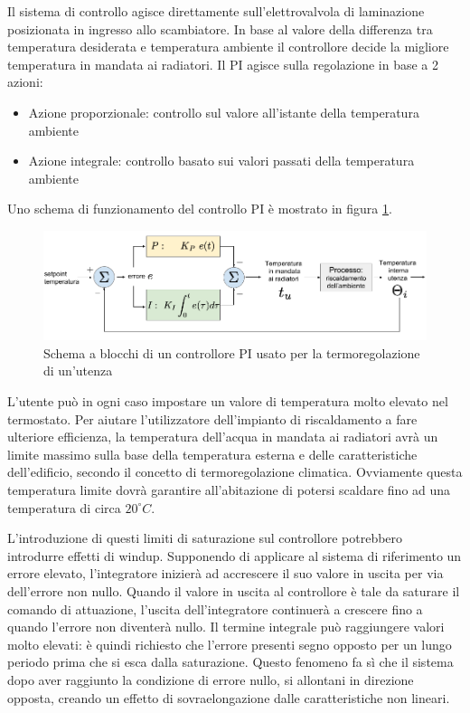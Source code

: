\documentclass[laurea,oneside,11pt]{USiena_tesiLM}
\begin{document}
Il sistema di controllo agisce direttamente sull'elettrovalvola di laminazione posizionata in ingresso allo scambiatore. In base al valore della differenza tra temperatura desiderata e temperatura ambiente il controllore decide la migliore temperatura in mandata ai radiatori. Il PI agisce sulla regolazione in base a 2 azioni:
\begin{itemize}
\item Azione proporzionale: controllo sul valore all'istante della temperatura ambiente
\item  Azione integrale: controllo basato sui valori passati della temperatura ambiente
\end{itemize}
Uno schema di funzionamento del controllo PI è mostrato in figura \ref{fig:PI}.

\begin{figure}[!ht]
\centering
\includegraphics[width=1.05\textwidth]{figure/PI} 
\caption{Schema a blocchi di un controllore PI usato per la termoregolazione di un'utenza}
\label{fig:PI}
\end{figure}
   
L'utente può in ogni caso impostare un valore di temperatura molto elevato nel termostato. Per aiutare l'utilizzatore dell'impianto di riscaldamento a fare ulteriore efficienza, la temperatura dell'acqua in mandata ai radiatori avrà un limite massimo sulla base della temperatura esterna e delle caratteristiche dell'edificio, secondo il concetto di termoregolazione climatica. 
Ovviamente questa temperatura limite dovrà garantire all'abitazione di potersi scaldare fino ad una temperatura di circa $20 ^{\circ}C$.

L'introduzione di questi limiti di saturazione sul controllore potrebbero introdurre effetti di windup.
Supponendo di applicare al sistema di riferimento un errore elevato, l'integratore inizierà ad accrescere il suo valore in uscita per via dell'errore non nullo. Quando il valore in uscita al controllore è tale da saturare il comando di attuazione, l'uscita dell'integratore continuerà a crescere fino a quando l'errore non diventerà nullo.
Il termine integrale può raggiungere valori molto elevati: è quindi richiesto che l'errore presenti segno opposto per un lungo periodo prima che si esca dalla saturazione. 
Questo fenomeno fa sì che il sistema dopo aver raggiunto la condizione di errore nullo, si allontani in direzione opposta, creando un effetto di sovraelongazione dalle caratteristiche non lineari.\\
\end{document}
